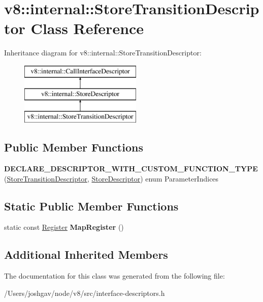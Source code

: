 \hypertarget{classv8_1_1internal_1_1_store_transition_descriptor}{}\section{v8\+:\+:internal\+:\+:Store\+Transition\+Descriptor Class Reference}
\label{classv8_1_1internal_1_1_store_transition_descriptor}
Inheritance diagram for v8\+:\+:internal\+:\+:Store\+Transition\+Descriptor\+:\begin{figure}[H]
\begin{center}
\leavevmode
\includegraphics[height=3.000000cm]{classv8_1_1internal_1_1_store_transition_descriptor}
\end{center}
\end{figure}
\subsection*{Public Member Functions}
\begin{DoxyCompactItemize}
\item 
{\bfseries D\+E\+C\+L\+A\+R\+E\+\_\+\+D\+E\+S\+C\+R\+I\+P\+T\+O\+R\+\_\+\+W\+I\+T\+H\+\_\+\+C\+U\+S\+T\+O\+M\+\_\+\+F\+U\+N\+C\+T\+I\+O\+N\+\_\+\+T\+Y\+PE} (\hyperlink{classv8_1_1internal_1_1_store_transition_descriptor}{Store\+Transition\+Descriptor}, \hyperlink{classv8_1_1internal_1_1_store_descriptor}{Store\+Descriptor}) enum Parameter\+Indices\hypertarget{classv8_1_1internal_1_1_store_transition_descriptor_af2dc496252e813bf93e65403071f841b}{}\label{classv8_1_1internal_1_1_store_transition_descriptor_af2dc496252e813bf93e65403071f841b}

\end{DoxyCompactItemize}
\subsection*{Static Public Member Functions}
\begin{DoxyCompactItemize}
\item 
static const \hyperlink{structv8_1_1internal_1_1_register}{Register} {\bfseries Map\+Register} ()\hypertarget{classv8_1_1internal_1_1_store_transition_descriptor_a34b99d21fc2d473f47396c4e4e8c5551}{}\label{classv8_1_1internal_1_1_store_transition_descriptor_a34b99d21fc2d473f47396c4e4e8c5551}

\end{DoxyCompactItemize}
\subsection*{Additional Inherited Members}


The documentation for this class was generated from the following file\+:\begin{DoxyCompactItemize}
\item 
/\+Users/joshgav/node/v8/src/interface-\/descriptors.\+h\end{DoxyCompactItemize}
